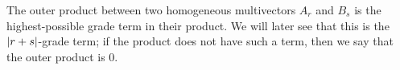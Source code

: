 \begin{definition}\label{d:outer-product1}
	The outer product between two homogeneous multivectors $A_r$ and $B_s$ is the highest-possible grade term in their product. We will later see that this is the $\left|r+s\right|$-grade term; if the product does not have such a term, then we say that the outer product is 0.
\end{definition}

